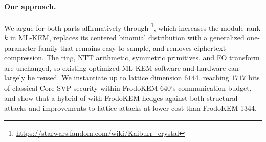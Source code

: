 \paragraph{Our approach.}We argue for both parts affirmatively through \kaiburr\footnote{\url{https://starwars.fandom.com/wiki/Kaiburr_crystal}}, which increases the module rank $k$ in ML-KEM, replaces its centered binomial distribution with a
generalized one-parameter family that remains easy to sample, and removes ciphertext compression. The ring,
NTT arithmetic, symmetric primitives, and FO transform are unchanged, so existing optimized ML-KEM software and hardware can largely be
reused. We instantiate \kaiburr up to lattice dimension $6144$, reaching $1717$ bits of classical Core-SVP security within
FrodoKEM-640's communication budget, and show that a hybrid of \kaiburr with FrodoKEM hedges against both structural attacks
and improvements to lattice attacks at lower cost than FrodoKEM-1344.

